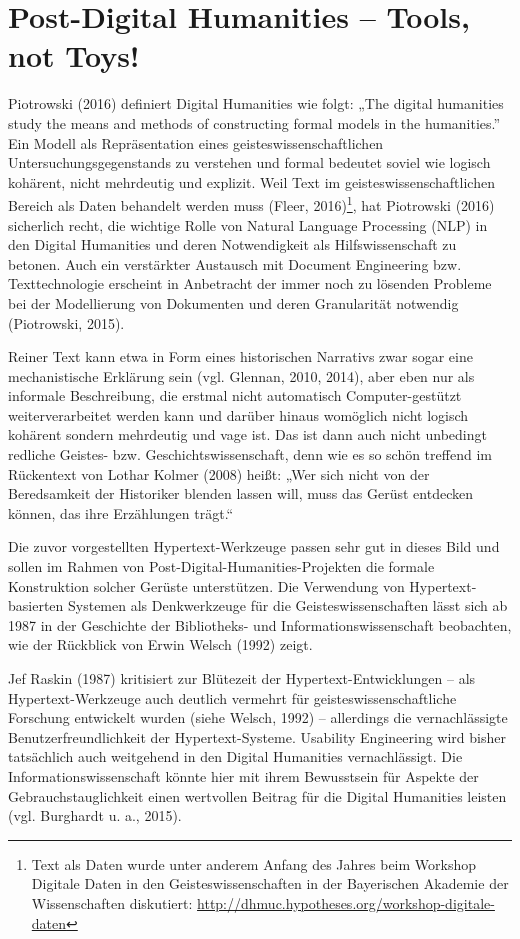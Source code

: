 \documentclass[a4paper,
fontsize=11pt,
oneside,
numbers=noperiodatend,
parskip=half-,
bibliography=totoc,
final
]{scrartcl}
\begin{document}
\section*{Post-Digital Humanities -- Tools, not
Toys!}\label{post-digital-humanities-tools-not-toys}

Piotrowski (2016) definiert Digital Humanities wie folgt: „The digital
humanities study the means and methods of constructing formal models in
the humanities.'' Ein Modell als Repräsentation eines
geisteswissenschaftlichen Untersuchungsgegenstands zu verstehen und
formal bedeutet soviel wie logisch kohärent, nicht mehrdeutig und
explizit. Weil Text im geisteswissenschaftlichen Bereich als Daten
behandelt werden muss (Fleer, 2016)\footnote{Text als Daten wurde unter
  anderem Anfang des Jahres beim Workshop Digitale Daten in den
  Geisteswissenschaften in der Bayerischen Akademie der Wissenschaften
  diskutiert: \url{http://dhmuc.hypotheses.org/workshop-digitale-daten}},
hat Piotrowski (2016) sicherlich recht, die wichtige Rolle von Natural
Language Processing (NLP) in den Digital Humanities und deren
Notwendigkeit als Hilfswissenschaft zu betonen. Auch ein verstärkter
Austausch mit Document Engineering bzw. Texttechnologie erscheint in
Anbetracht der immer noch zu lösenden Probleme bei der Modellierung von
Dokumenten und deren Granularität notwendig (Piotrowski, 2015).

Reiner Text kann etwa in Form eines historischen Narrativs zwar sogar
eine mechanistische Erklärung sein (vgl. Glennan, 2010, 2014), aber eben
nur als informale Beschreibung, die erstmal nicht automatisch
Computer-gestützt weiterverarbeitet werden kann und darüber hinaus
womöglich nicht logisch kohärent sondern mehrdeutig und vage ist. Das
ist dann auch nicht unbedingt redliche Geistes- bzw.
Geschichtswissenschaft, denn wie es so schön treffend im Rückentext von
Lothar Kolmer (2008) heißt: „Wer sich nicht von der Beredsamkeit der
Historiker blenden lassen will, muss das Gerüst entdecken können, das
ihre Erzählungen trägt.``

Die zuvor vorgestellten Hypertext-Werkzeuge passen sehr gut in dieses
Bild und sollen im Rahmen von Post-Digital-Humanities-Projekten die
formale Konstruktion solcher Gerüste unterstützen. Die Verwendung von
Hypertext- basierten Systemen als Denkwerkzeuge für die
Geisteswissenschaften lässt sich ab 1987 in der Geschichte der
Bibliotheks- und Informationswissenschaft beobachten, wie der Rückblick
von Erwin Welsch (1992) zeigt.

Jef Raskin (1987) kritisiert zur Blütezeit der Hypertext-Entwicklungen
-- als Hypertext-Werkzeuge auch deutlich vermehrt für
geisteswissenschaftliche Forschung entwickelt wurden (siehe Welsch,
1992) -- allerdings die vernachlässigte Benutzerfreundlichkeit der
Hypertext-Systeme. Usability Engineering wird bisher tatsächlich auch
weitgehend in den Digital Humanities vernachlässigt. Die
Informationswissenschaft könnte hier mit ihrem Bewusstsein für Aspekte
der Gebrauchstauglichkeit einen wertvollen Beitrag für die Digital
Humanities leisten (vgl. Burghardt u. a., 2015).
\end{document}
